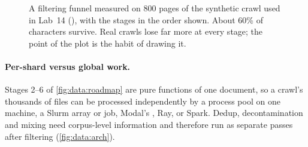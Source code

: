 \begin{figure}[t]
\centering
{}
\caption{A filtering funnel measured on 800 pages of the synthetic crawl used in Lab~14
(), with the stages in the order shown. About 60\% of characters
survive. Real crawls lose far more at every stage; the point of the plot is the habit of drawing it.}
\label{fig:data:funnel}
\end{figure}

\paragraph{Per-shard versus global work.} Stages 2--6 of \cref{fig:data:roadmap} are pure
functions of one document, so a crawl's thousands of files can be processed independently by a
process pool on one machine, a Slurm array or  job, Modal's , Ray, or Spark.
Dedup, decontamination and mixing need corpus-level information and therefore run as separate
passes after filtering (\cref{fig:data:arch}).

